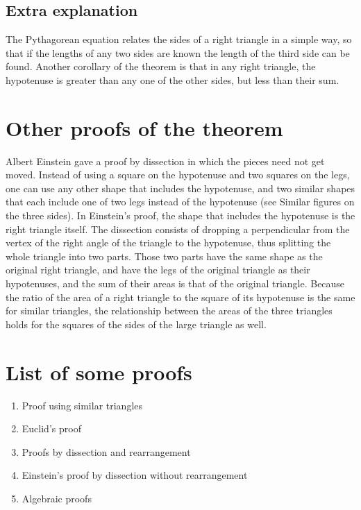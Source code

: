 \documentclass[]{hdsr}
\begin{document}
\subsection{Extra explanation}

The Pythagorean equation relates the sides of a right triangle in a simple way, so that if the lengths of any two sides are known the length of the third side can be found. Another corollary of the theorem is that in any right triangle, the hypotenuse is greater than any one of the other sides, but less than their sum.


\section{Other proofs of the theorem}
Albert Einstein gave a proof by dissection in which the pieces need not get moved. Instead of using a square on the hypotenuse and two squares on the legs, one can use any other shape that includes the hypotenuse, and two similar shapes that each include one of two legs instead of the hypotenuse (see Similar figures on the three sides). In Einstein's proof, the shape that includes the hypotenuse is the right triangle itself. The dissection consists of dropping a perpendicular from the vertex of the right angle of the triangle to the hypotenuse, thus splitting the whole triangle into two parts. Those two parts have the same shape as the original right triangle, and have the legs of the original triangle as their hypotenuses, and the sum of their areas is that of the original triangle. Because the ratio of the area of a right triangle to the square of its hypotenuse is the same for similar triangles, the relationship between the areas of the three triangles holds for the squares of the sides of the large triangle as well.

\section{List of some proofs}
\begin{enumerate}
     \item Proof using similar triangles
    \item Euclid's proof
    \item Proofs by dissection and rearrangement
    \item Einstein's proof by dissection without rearrangement
    \item Algebraic proofs
\end{enumerate}
\end{document}
